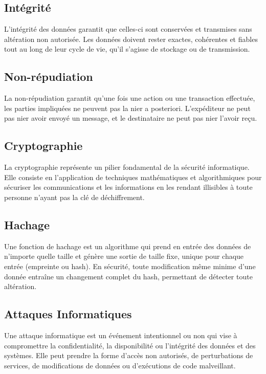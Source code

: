 \subsection{Intégrité}
L'intégrité des données garantit que celles-ci sont conservées et transmises sans altération non autorisée. Les données doivent rester exactes, cohérentes et fiables tout au long de leur cycle de vie, qu'il s'agisse de stockage ou de transmission.

\subsection{Non-répudiation}
La non-répudiation garantit qu'une fois une action ou une transaction effectuée, les parties impliquées ne peuvent pas la nier a posteriori. L'expéditeur ne peut pas nier avoir envoyé un message, et le destinataire ne peut pas nier l'avoir reçu.

\subsection{Cryptographie}
La cryptographie représente un pilier fondamental de la sécurité informatique. Elle consiste en l'application de techniques mathématiques et algorithmiques pour sécuriser les communications et les informations en les rendant illisibles à toute personne n'ayant pas la clé de déchiffrement.

\subsection{Hachage}
Une fonction de hachage est un algorithme qui prend en entrée des données de n'importe quelle taille et génère une sortie de taille fixe, unique pour chaque entrée (\og{}empreinte\fg{} ou \og{}hash\fg{}). En sécurité, toute modification même minime d'une donnée entraîne un changement complet du hash, permettant de détecter toute altération.

\subsection{Attaques Informatiques}
Une attaque informatique est un événement intentionnel ou non qui vise à compromettre la confidentialité, la disponibilité ou l'intégrité des données et des systèmes. Elle peut prendre la forme d'accès non autorisés, de perturbations de services, de modifications de données ou d'exécutions de code malveillant.

